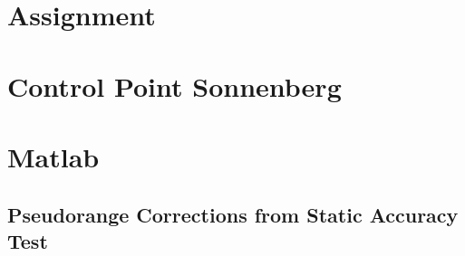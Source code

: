 \chapter{Assignment}\label{appendix:assignment}




\chapter{Control Point Sonnenberg}\label{appendix:control_point_sonnenberg}




\chapter{Matlab}\label{appendix:matlab_code}

\section{Pseudorange Corrections from Static Accuracy Test}




